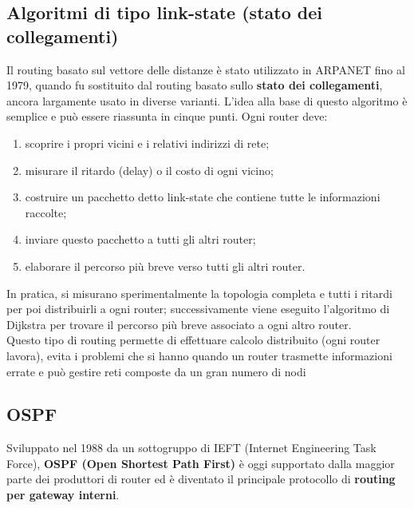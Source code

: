         \subsection{Algoritmi di tipo link-state (stato dei collegamenti)}
        Il routing basato sul vettore delle distanze è stato utilizzato in ARPANET fino al 1979, quando
        fu sostituito dal routing basato sullo \textbf{stato dei collegamenti}, ancora largamente usato in
        diverse varianti. L’idea alla base di questo algoritmo è semplice e può essere riassunta in cinque
        punti. Ogni router deve:

        \begin{enumerate}
            \item scoprire i propri vicini e i relativi indirizzi di rete;
            \item misurare il ritardo (delay) o il costo di ogni vicino;
            \item costruire un pacchetto detto link-state che contiene tutte le informazioni raccolte;
            \item inviare questo pacchetto a tutti gli altri router;
            \item elaborare il percorso più breve verso tutti gli altri router.
        \end{enumerate}

        In pratica, si misurano sperimentalmente la topologia completa e tutti i ritardi per poi
        distribuirli a ogni router; successivamente viene eseguito l’algoritmo di Dijkstra per trovare il
        percorso più breve associato a ogni altro router.\\
        
        Questo tipo di routing permette di effettuare calcolo distribuito (ogni router lavora), evita i
        problemi che si hanno quando un router trasmette informazioni errate e può gestire reti
        composte da un gran numero di nodi

        \subsection{OSPF}
        Sviluppato nel 1988 da un sottogruppo di IEFT (Internet Engineering Task Force), \textbf{OSPF (Open
        Shortest Path First)} è oggi supportato dalla maggior parte dei produttori di router ed è
        diventato il principale protocollo di \textbf{routing per gateway interni}.\\
        
